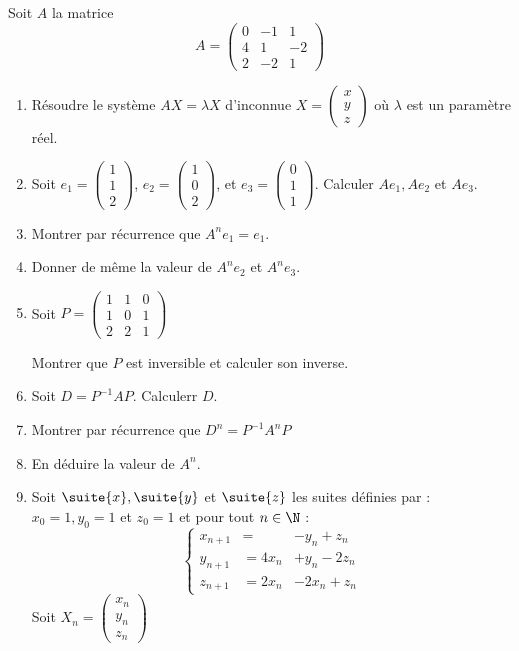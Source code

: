 \documentclass[a4paper, 11pt,reqno]{article}
\begin{document}
\begin{exercice}
Soit $A$ la matrice 
$$A=\left(
\begin{array}{ccc}
0&-1&1\\
4&1&-2\\
2&-2&1
\end{array}
 \right)$$
 
 
\begin{enumerate}
\item Résoudre le système $AX=\lambda X$ d'inconnue $X =\left(
\begin{array}{c}
x\\
y\\
z
\end{array}
 \right)$ où $\lambda$ est un paramètre réel. 
 
 \item Soit $e_1= \left(
\begin{array}{c}
1\\
1\\
2
\end{array}
 \right)$,  $e_2= \left(
\begin{array}{c}
1\\
0\\
2
\end{array}
 \right)$, et  $e_3= \left(
\begin{array}{c}
0\\
1\\
1
\end{array}
 \right)$.
 Calculer $Ae_1, Ae_2$ et $Ae_3$. 
 
\item Montrer par récurrence que $A^ne_1= e_1$. 
\item Donner de même la valeur de $A^n e_2 $ et $A^n e_3$.
\item Soit $P= \left(
\begin{array}{ccc}
1&1&0\\
1&0&1\\
2&2&1
\end{array}
 \right)$ 
 
 Montrer que $P$ est inversible et calculer son inverse. 
 \item Soit $D=P^{-1}AP$. Calculerr $D$. 
 \item Montrer par récurrence que $D^n = P^{-1}A^n P$
 \item En déduire la valeur de $A^n$. 
\item Soit $\suite{x}, \suite{y} $ et $\suite{z}$ les suites définies par : 
$x_0=1, y_0=1 $ et $z_0=1$ et pour tout $n\in \N$ :
$$\left\{
\begin{array}{cll}
x_{n+1} &= &-y_n+z_n\\
y_{n+1}&=4x_n&+y_n-2z_n\\
z_{n+1}&=2x_n&-2x_n+z_n
\end{array}
 \right.$$ 
Soit $X_n = \left(
\begin{array}{c}
x_{n}\\
y_{n}\\
z_{n}
\end{array}
 \right)$
 

\end{enumerate}
\end{exercice}
\end{document}
